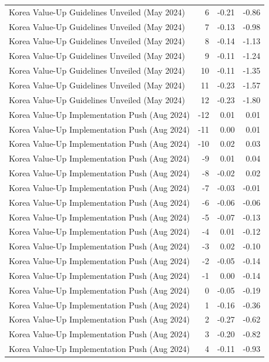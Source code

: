 \begin{table}
\begin{tabular}{lrrr}
Korea Value-Up Guidelines Unveiled (May 2024) & 6 & -0.21 & -0.86 \\
Korea Value-Up Guidelines Unveiled (May 2024) & 7 & -0.13 & -0.98 \\
Korea Value-Up Guidelines Unveiled (May 2024) & 8 & -0.14 & -1.13 \\
Korea Value-Up Guidelines Unveiled (May 2024) & 9 & -0.11 & -1.24 \\
Korea Value-Up Guidelines Unveiled (May 2024) & 10 & -0.11 & -1.35 \\
Korea Value-Up Guidelines Unveiled (May 2024) & 11 & -0.23 & -1.57 \\
Korea Value-Up Guidelines Unveiled (May 2024) & 12 & -0.23 & -1.80 \\
Korea Value-Up Implementation Push (Aug 2024) & -12 & 0.01 & 0.01 \\
Korea Value-Up Implementation Push (Aug 2024) & -11 & 0.00 & 0.01 \\
Korea Value-Up Implementation Push (Aug 2024) & -10 & 0.02 & 0.03 \\
Korea Value-Up Implementation Push (Aug 2024) & -9 & 0.01 & 0.04 \\
Korea Value-Up Implementation Push (Aug 2024) & -8 & -0.02 & 0.02 \\
Korea Value-Up Implementation Push (Aug 2024) & -7 & -0.03 & -0.01 \\
Korea Value-Up Implementation Push (Aug 2024) & -6 & -0.06 & -0.06 \\
Korea Value-Up Implementation Push (Aug 2024) & -5 & -0.07 & -0.13 \\
Korea Value-Up Implementation Push (Aug 2024) & -4 & 0.01 & -0.12 \\
Korea Value-Up Implementation Push (Aug 2024) & -3 & 0.02 & -0.10 \\
Korea Value-Up Implementation Push (Aug 2024) & -2 & -0.05 & -0.14 \\
Korea Value-Up Implementation Push (Aug 2024) & -1 & 0.00 & -0.14 \\
Korea Value-Up Implementation Push (Aug 2024) & 0 & -0.05 & -0.19 \\
Korea Value-Up Implementation Push (Aug 2024) & 1 & -0.16 & -0.36 \\
Korea Value-Up Implementation Push (Aug 2024) & 2 & -0.27 & -0.62 \\
Korea Value-Up Implementation Push (Aug 2024) & 3 & -0.20 & -0.82 \\
Korea Value-Up Implementation Push (Aug 2024) & 4 & -0.11 & -0.93 \\

\end{tabular}
\end{table}
